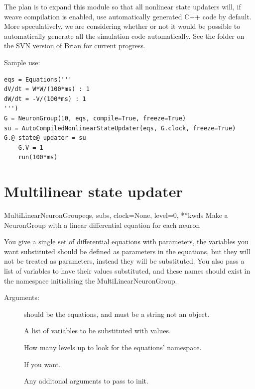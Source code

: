 \documentclass[letterpaper,10pt,english]{manual}
\begin{document}
The plan is to expand this module so that all nonlinear state updaters will, if weave compilation is
enabled, use automatically generated C++ code by default. More speculatively, we are considering
whether or not it would be possible to automatically generate all the simulation code automatically.
See the  folder on the SVN version of Brian for current progress.

Sample use:

\begin{Verbatim}[commandchars=@\[\]]
eqs = Equations('''
dV/dt = W*W/(100*ms) : 1
dW/dt = -V/(100*ms) : 1
''')
G = NeuronGroup(10, eqs, compile=True, freeze=True)
su = AutoCompiledNonlinearStateUpdater(eqs, G.clock, freeze=True)
G.@_state@_updater = su
    G.V = 1
    run(100*ms)
\end{Verbatim}

\resetcurrentobjects


\section{Multilinear state updater}

\hypertarget{brian.experimental.multilinearstateupdater.MultiLinearNeuronGroup}{}\begin{classdesc}{MultiLinearNeuronGroup}{eqs, subs, clock=None, level=0, **kwds}
Make a NeuronGroup with a linear differential equation for each neuron

You give a single set of differential equations with parameters, the
variables you want substituted should be defined as parameters in the equations,
but they will not be treated as parameters, instead they will be substituted.
You also pass a list of variables to have their values substituted, and these
names should exist in the namespace initialising the MultiLinearNeuronGroup.

Arguments:
\begin{description}
\item[]
should be the equations, and must be a string not an  object.

\item[]
A list of variables to be substituted with values.

\item[]
How many levels up to look for the equations' namespace.

\item[]
If you want.

\item[]
Any additonal arguments to pass to  init.

\end{description}
\end{classdesc}
\end{document}
